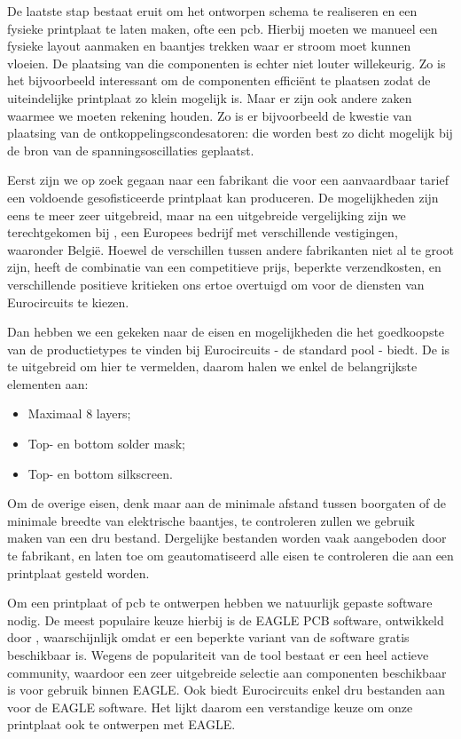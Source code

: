 De laatste stap bestaat eruit om het ontworpen schema te realiseren en een fysieke printplaat te laten maken, ofte een \ac{pcb}. Hierbij moeten we manueel een fysieke layout aanmaken en baantjes trekken waar er stroom moet kunnen vloeien. De plaatsing van die componenten is echter niet louter willekeurig. Zo is het bijvoorbeeld interessant om de componenten efficiënt te plaatsen zodat de uiteindelijke printplaat zo klein mogelijk is. Maar er zijn ook andere zaken waarmee we moeten rekening houden. Zo is er bijvoorbeeld de kwestie van plaatsing van de ontkoppelingscondesatoren: die worden best zo dicht mogelijk bij de bron van de spanningsoscillaties geplaatst.

Eerst zijn we op zoek gegaan naar een fabrikant die voor een aanvaardbaar tarief een voldoende gesofisticeerde printplaat kan produceren. De mogelijkheden zijn eens te meer zeer uitgebreid, maar na een uitgebreide vergelijking zijn we terechtgekomen bij , een Europees bedrijf met verschillende vestigingen, waaronder België. Hoewel de verschillen tussen andere fabrikanten niet al te groot zijn, heeft de combinatie van een competitieve prijs, beperkte verzendkosten, en verschillende positieve kritieken ons ertoe overtuigd om voor de diensten van Eurocircuits te kiezen.

Dan hebben we een gekeken naar de eisen en mogelijkheden die het goedkoopste van de productietypes te vinden bij Eurocircuits - de standard pool - biedt. De  is te uitgebreid om hier te vermelden, daarom halen we enkel de belangrijkste elementen aan:
\begin{itemize}
\item Maximaal 8 layers;
\item Top- en bottom solder mask;
\item Top- en bottom silkscreen.
\end{itemize}
Om de overige eisen, denk maar aan de minimale afstand tussen boorgaten of de minimale breedte van elektrische baantjes, te controleren zullen we gebruik maken van een \ac{dru} bestand. Dergelijke bestanden worden vaak aangeboden door te fabrikant, en laten toe om geautomatiseerd alle eisen te controleren die aan een printplaat gesteld worden.

Om een printplaat of \ac{pcb} te ontwerpen hebben we natuurlijk gepaste software nodig. De meest populaire keuze hierbij is de EAGLE PCB software, ontwikkeld door , waarschijnlijk omdat er een beperkte variant van de software gratis beschikbaar is. Wegens de populariteit van de tool bestaat er een heel actieve community, waardoor een zeer uitgebreide selectie aan componenten beschikbaar is voor gebruik binnen EAGLE. Ook biedt Eurocircuits enkel \ac{dru} bestanden aan voor de EAGLE software. Het lijkt daarom een verstandige keuze om onze printplaat ook te ontwerpen met EAGLE.

